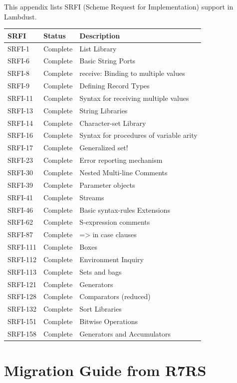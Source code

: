 \documentclass[twoside,twocolumn]{algol60}
\begin{document}
This appendix lists SRFI (Scheme Request for Implementation) support in Lambdust.

\onecolumn
\begin{tabular}{|l|l|p{10cm}|}
\hline
\textbf{SRFI} & \textbf{Status} & \textbf{Description} \\
\hline
SRFI-1 & Complete & List Library \\
SRFI-6 & Complete & Basic String Ports \\
SRFI-8 & Complete & receive: Binding to multiple values \\
SRFI-9 & Complete & Defining Record Types \\
SRFI-11 & Complete & Syntax for receiving multiple values \\
SRFI-13 & Complete & String Libraries \\
SRFI-14 & Complete & Character-set Library \\
SRFI-16 & Complete & Syntax for procedures of variable arity \\
SRFI-17 & Complete & Generalized set! \\
SRFI-23 & Complete & Error reporting mechanism \\
SRFI-30 & Complete & Nested Multi-line Comments \\
SRFI-39 & Complete & Parameter objects \\
SRFI-41 & Complete & Streams \\
SRFI-46 & Complete & Basic syntax-rules Extensions \\
SRFI-62 & Complete & S-expression comments \\
SRFI-87 & Complete & => in case clauses \\
SRFI-111 & Complete & Boxes \\
SRFI-112 & Complete & Environment Inquiry \\
SRFI-113 & Complete & Sets and bags \\
SRFI-121 & Complete & Generators \\
SRFI-128 & Complete & Comparators (reduced) \\
SRFI-132 & Complete & Sort Libraries \\
SRFI-151 & Complete & Bitwise Operations \\
SRFI-158 & Complete & Generators and Accumulators \\
\hline
\end{tabular}
\twocolumn

\chapter{Migration Guide from R7RS}
\label{app:migration}
\end{document}
